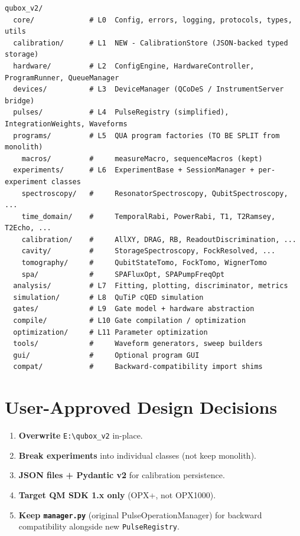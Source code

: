 \documentclass[11pt]{article}
\begin{document}
\begin{lstlisting}
qubox_v2/
  core/             # L0  Config, errors, logging, protocols, types, utils
  calibration/      # L1  NEW - CalibrationStore (JSON-backed typed storage)
  hardware/         # L2  ConfigEngine, HardwareController, ProgramRunner, QueueManager
  devices/          # L3  DeviceManager (QCoDeS / InstrumentServer bridge)
  pulses/           # L4  PulseRegistry (simplified), IntegrationWeights, Waveforms
  programs/         # L5  QUA program factories (TO BE SPLIT from monolith)
    macros/         #     measureMacro, sequenceMacros (kept)
  experiments/      # L6  ExperimentBase + SessionManager + per-experiment classes
    spectroscopy/   #     ResonatorSpectroscopy, QubitSpectroscopy, ...
    time_domain/    #     TemporalRabi, PowerRabi, T1, T2Ramsey, T2Echo, ...
    calibration/    #     AllXY, DRAG, RB, ReadoutDiscrimination, ...
    cavity/         #     StorageSpectroscopy, FockResolved, ...
    tomography/     #     QubitStateTomo, FockTomo, WignerTomo
    spa/            #     SPAFluxOpt, SPAPumpFreqOpt
  analysis/         # L7  Fitting, plotting, discriminator, metrics
  simulation/       # L8  QuTiP cQED simulation
  gates/            # L9  Gate model + hardware abstraction
  compile/          # L10 Gate compilation / optimization
  optimization/     # L11 Parameter optimization
  tools/            #     Waveform generators, sweep builders
  gui/              #     Optional program GUI
  compat/           #     Backward-compatibility import shims
\end{lstlisting}

\section{User-Approved Design Decisions}

\begin{enumerate}
  \item \textbf{Overwrite} \texttt{E:\textbackslash qubox\_v2} in-place.
  \item \textbf{Break experiments} into individual classes
        (not keep monolith).
  \item \textbf{JSON files + Pydantic v2} for calibration persistence.
  \item \textbf{Target QM SDK 1.x only} (OPX+, not OPX1000).
  \item \textbf{Keep \texttt{manager.py}} (original PulseOperationManager)
        for backward compatibility alongside new \texttt{PulseRegistry}.
\end{enumerate}
\end{document}
